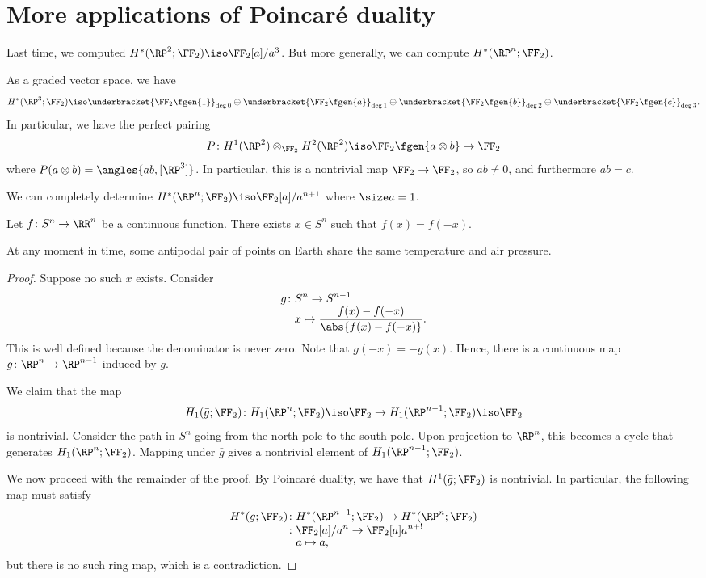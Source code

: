 \documentclass{standalone}
\begin{document}
\section{More applications of Poincar\'e duality}
Last time, we computed \(H^*(\RP^2; \FF_2) \iso \FF_2[a]/a^3\).
But more generally, we can compute \(H^*(\RP^n; \FF_2)\).
\begin{example}[\(H^*(\RP^3; \FF_2)\)]
  As a graded vector space, we have
  \[
    H^*(\RP^3; \FF_2)
      \iso \underbracket{\FF_2\fgen{1}}_{\deg 0} \oplus
           \underbracket{\FF_2\fgen{a}}_{\deg 1} \oplus
           \underbracket{\FF_2\fgen{b}}_{\deg 2} \oplus
           \underbracket{\FF_2\fgen{c}}_{\deg 3}.
  \]
  In particular, we have the perfect pairing
  \[
    P \colon
      H^1(\RP^2) \otimes_{\FF_2} H^2(\RP^2) \iso \FF_2\fgen{a \otimes b}
      \to \FF_2
  \]
  where \(P(a \otimes b) = \angles{ab, [\RP^3]}\).
  In particular, this is a nontrivial map \(\FF_2 \to \FF_2\),
  so \(ab \neq 0\), and furthermore \(ab = c\).

  We can completely determine \(H^*(\RP^n; \FF_2) \iso \FF_2[a]/a^{n+1}\)
  where \(\size a = 1\).
\end{example}


\begin{theorem}
  Let \(f \colon S^n \to \RR^n\) be a continuous function.
  There exists \(x \in S^n\) such that \(f(x) = f(-x)\).
\end{theorem}
\begin{example}
  At any moment in time, some antipodal pair of points on Earth
  share the same temperature and air pressure.
\end{example}
\begin{proof}
  Suppose no such \(x\) exists.
  Consider
  \begin{align*}
    g \colon& S^n \to S^{n-1} \\[-1ex]
      & x \mapsto \frac{f(x) - f(-x)}{\abs{f(x) - f(-x)}}.
  \end{align*}
  This is well defined because the denominator is never zero.
  Note that \(g(-x) = -g(x)\).
  Hence, there is a continuous map \(\bar g \colon \RP^n \to \RP^{n-1}\)
  induced by \(g\).

  We claim that the map
  \[
    H_1(\bar g; \FF_2) \colon H_1(\RP^n; \FF_2) \iso \FF_2
                            \to H_1(\RP^{n-1}; \FF_2) \iso \FF_2
  \]
is nontrivial.
Consider the path in \(S^n\) going from the north pole to the south pole.
Upon projection to \(\RP^n\), this becomes a cycle that generates
\(H_1(\RP^n; \FF_2)\).
Mapping under \(\bar g\) gives a nontrivial element of
\(H_1(\RP^{n-1}; \FF_2)\).

We now proceed with the remainder of the proof.
By Poincar\'e duality, we have that \(H^1(\bar g; \FF_2)\) is nontrivial.
In particular, the following map must satisfy
\begin{align*}
  H^*(\bar g; \FF_2) \colon& H^*(\RP^{n-1}; \FF_2) \to
                             H^*(\RP^{n}; \FF_2) \\[-1ex]
    \colon& \FF_2[a]/a^n \to \FF_2[a]a^{n+!} \\[-1ex]
    & a \mapsto a,
\end{align*}
but there is no such ring map, which is a contradiction.
\end{proof}
\end{document}
